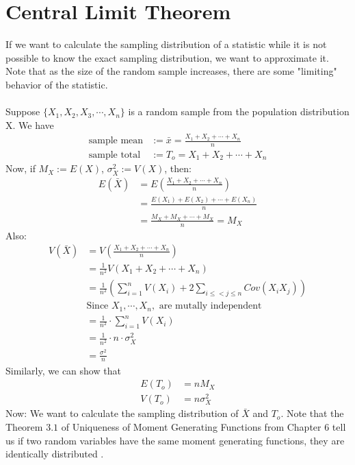 \documentclass[11pt,oneside]{book}
\theoremstyle{break}
\theoremstyle{break}
\begin{document}
\section[Central Limit Theorem]{\color{DarkOrchid}Central Limit Theorem}
If we want to calculate the sampling distribution of a statistic while it is not possible to know the exact sampling distribution, we want to approximate it. Note that as the size of the random sample increases, there are some  "limiting" behavior of the statistic.\\
\hfill\\
Suppose $\{X_1,X_2,X_3,\cdots,X_n\}$ is a random sample from the population distribution X. We have \begin{align*}
\text{sample mean}&:=\bar{x}=\frac{X_1+X_2+\cdots+X_n}{n}\\
\text{sample total}&:=T_o=X_1+X_2+\cdots+X_n
\end{align*}
Now, if $M_X:=E(X)$, $\sigma_X^2:=V(X)$, then:\begin{align*}
E(\bar{X})&=E\left(\frac{X_1+X_2+\cdots+X_n}{n} \right)\\
&=\frac{E(X_1)+E(X_2)+\cdots+E(X_n)}{n}\\
&=\frac{M_X+M_X+\cdots+M_X}{n}=M_X
\end{align*}
Also:\begin{align*}
V(\bar{X})&=V\left(\frac{X_1+X_2+\cdots+X_n}{n} \right)\\
&=\frac{1}{n^2}V\left(X_1+X_2+\cdots+X_n\right)\\
&=\frac{1}{n^2}\left(\sum_{i=1}^n V(X_i)+2\sum_{i\leq <j \leq n}Cov(X_iX_j) \right)\\
&\text{Since }X_1,\cdots,X_n,\text{ are mutally independent}\\
&=\frac{1}{n^2}\cdot \sum_{i=1}^n V(X_i)\\
&=\frac{1}{n^2}\cdot n \cdot \sigma_X^2\\
&=\frac{\sigma^2}{n}
\end{align*}
Similarly, we can show that \begin{align*}
E(T_o)&=nM_X\\
V(T_o)&=n\sigma_X^2
\end{align*}
Now: We want to calculate the sampling distribution of $\bar{X}$ and $T_o$. Note that the Theorem $3.1$ of Uniqueness of Moment Generating Functions from Chapter 6 tell us if two random variables have the same moment generating functions, they are identically distributed .\\
\hfill\\
\end{document}

